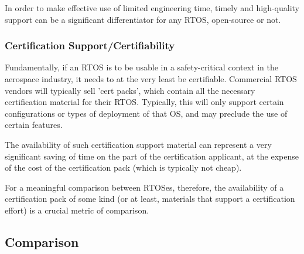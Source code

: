 In order to make effective use of limited engineering time, timely and high-quality support can be a significant differentiator for any RTOS, open-source or not.


\subsubsection{Certification Support/Certifiability}

Fundamentally, if an RTOS is to be usable in a safety-critical context in the aerospace industry, it needs to at the very least be certifiable. Commercial RTOS vendors will typically sell 'cert packs', which contain all the necessary certification material for their RTOS. Typically, this will only support certain configurations or types of deployment of that OS, and may preclude the use of certain features.

The availability of such certification support material can represent a very significant saving of time on the part of the certification applicant, at the expense of the cost of the certification pack (which is typically not cheap).

For a meaningful comparison between RTOSes, therefore, the availability of a certification pack of some kind (or at least, materials that support a certification effort) is a crucial metric of comparison.


\subsection{Comparison}

